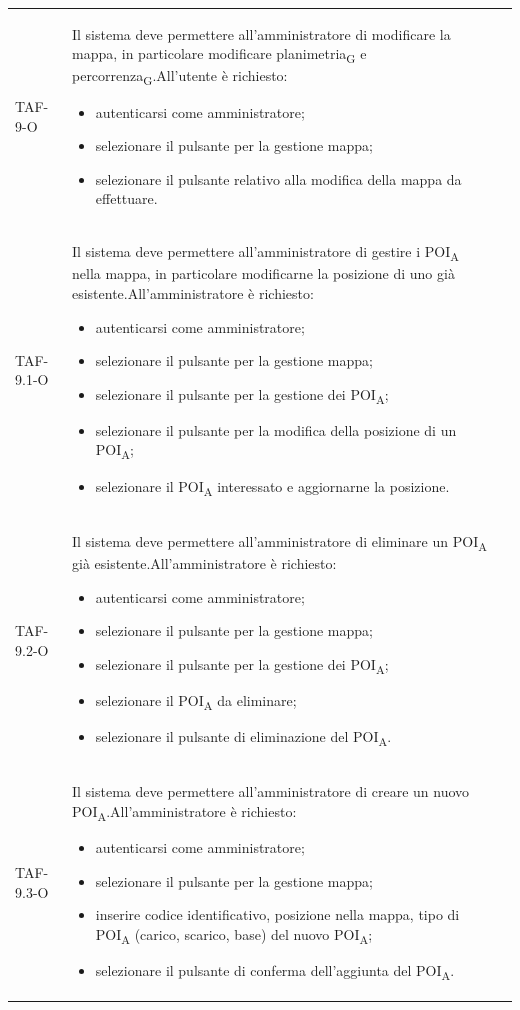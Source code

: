 \begin{longtable}{ >{\centering}p{} >{}p{}
		>{\centering}p{}}
	TAF-9-O & Il sistema deve permettere all'amministratore di modificare la mappa, in particolare modificare planimetria\textsubscript{G} e percorrenza\textsubscript{G}.\newline All'utente è richiesto: \begin{itemize} \item autenticarsi come amministratore; \item selezionare il pulsante per la gestione mappa; \item selezionare il pulsante relativo alla modifica della mappa da effettuare.\end{itemize} & 0\tabularnewline
	TAF-9.1-O & Il sistema deve permettere all'amministratore di gestire i POI\textsubscript{A} nella mappa, in particolare modificarne la posizione di uno già esistente.\newline All'amministratore è richiesto: \begin{itemize}\item autenticarsi come amministratore; \item selezionare il pulsante per la gestione mappa; \item selezionare il pulsante per la gestione dei POI\textsubscript{A}; \item selezionare il pulsante per la modifica della posizione di un POI\textsubscript{A}; \item selezionare il POI\textsubscript{A} interessato e aggiornarne la posizione.\end{itemize} & 0\tabularnewline
	TAF-9.2-O & Il sistema deve permettere all'amministratore di eliminare un POI\textsubscript{A} già esistente.\newline All'amministratore è richiesto: \begin{itemize}\item autenticarsi come amministratore; \item selezionare il pulsante per la gestione mappa; \item selezionare il pulsante per la gestione dei POI\textsubscript{A}; \item selezionare il POI\textsubscript{A} da eliminare; \item selezionare il pulsante di eliminazione del POI\textsubscript{A}.\end{itemize} & 0\tabularnewline
	TAF-9.3-O & Il sistema deve permettere all'amministratore di creare un nuovo POI\textsubscript{A}.\newline All'amministratore è richiesto: \begin{itemize}\item autenticarsi come amministratore; \item selezionare il pulsante per la gestione mappa; \item inserire codice identificativo, posizione nella mappa, tipo di POI\textsubscript{A} (carico, scarico, base) del nuovo POI\textsubscript{A}; \item selezionare il pulsante di conferma dell'aggiunta del POI\textsubscript{A}.\end{itemize} & 0\tabularnewline


\end{longtable}
